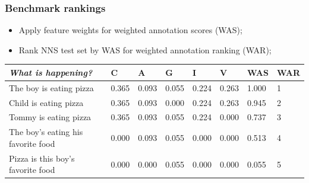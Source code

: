 \documentclass[handout,xcolor={dvipsnames}]{beamer}
\begin{document}
\begin{frame}
\frametitle{Benchmark rankings}
\small
\begin{itemize}
\pause
\item Apply feature weights for weighted annotation scores (WAS);
\pause
\item Rank NNS test set by WAS for weighted annotation ranking (WAR);
\pause
\end{itemize}


\vspace{-1em}
\begin{footnotesize}
\begin{table}[htb!]
\begin{center}
\begin{tabular}{|p{2.7cm}||p{.7cm}|p{.7cm}|p{.7cm}|p{.7cm}|p{.7cm}|p{.7cm}|p{.6cm}|}
\hline
\textit{What is happening?} & C & A & G & I & V & WAS & WAR \\
\hline
\hline
The boy is eating pizza & 0.365 & 0.093 & 0.055 & 0.224 & 0.263 & 1.000 & 1 \\
\hline
Child is eating pizza & 0.365 & 0.093 & 0.000 & 0.224 & 0.263 & 0.945 & 2 \\
\hline
Tommy is eating pizza & 0.365 & 0.093 & 0.055 & 0.224 & 0.000 & 0.737 & 3 \\
\hline
The boy's eating his favorite food & 0.000 & 0.093 & 0.055 & 0.000 & 0.000 & 0.513 & 4 \\
\hline
Pizza is this boy's favorite food & 0.000 & 0.000 & 0.055 & 0.000 & 0.000 & 0.055 & 5 \\
\hline
\end{tabular}
\end{center}
\end{table}
\end{footnotesize}


\end{frame}
\end{document}
